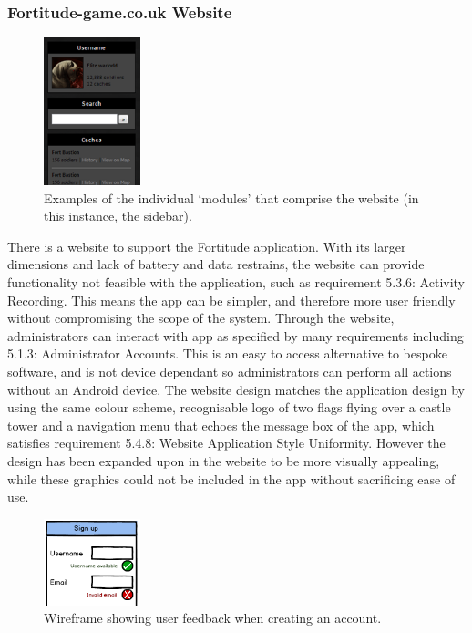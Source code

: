 \subsubsection{Fortitude-game.co.uk Website}

\begin{figure}
	\vspace{-15pt}
	\begin{center}
	\includegraphics[width=0.25\textwidth]{images/sidebar_modules}
	\caption{Examples of the individual ‘modules’ that comprise the website (in this instance, the sidebar).}
	\label{sidebar_modules}
	\end{center}
	\vspace{-20pt}
\end{figure}

There is a website to support the Fortitude application. With its larger dimensions and lack of battery and data restrains, the website can provide functionality not feasible with the application, such as requirement 5.3.6: Activity Recording. This means the app can be simpler, and therefore more user friendly without compromising the scope of the system.
Through the website, administrators can interact with app as specified by many requirements including 5.1.3: Administrator Accounts. This is an easy to access alternative to bespoke software, and is not device dependant so administrators can perform all actions without an Android device.
The website design matches the application design by using the same colour scheme, recognisable logo of two flags flying over a castle tower and a navigation menu that echoes the message box of the app, which satisfies requirement 5.4.8: Website Application Style Uniformity. However the design has been expanded upon in the website to be more visually appealing, while these graphics could not be included in the app without sacrificing ease of use.

\begin{figure}
	\vspace{-20pt}
	\begin{center}
	\includegraphics[width=0.25\textwidth]{images/sign_up_wireframe}
	\caption{Wireframe showing user feedback when creating an account.}
	\label{sign_up_wireframe}
	\end{center}
\end{figure}

